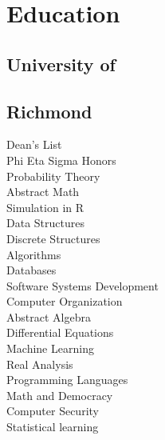 \documentclass{resume}
\begin{document}

\bigskip

%
%

\begin{minipage}[t]{0.33\textwidth}


\section{Education}

\subsection{University of}
\subsection{Richmond}
Dean's List\\

Phi Eta Sigma Honors \\
{}
Probability Theory \\
Abstract Math\\
Simulation in R\\
Data Structures\\
Discrete Structures\\
Algorithms\\
Databases\\
Software Systems Development\\
Computer Organization\\
Abstract Algebra\\
Differential Equations\\
Machine Learning\\
Real Analysis\\
Programming Languages\\
Math and Democracy\\
Computer Security\\
Statistical learning
\sectionsep



\end{minipage}
\end{document}
